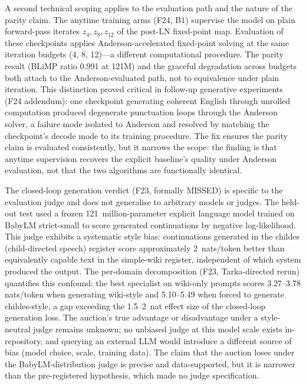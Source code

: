 A second technical scoping applies to the evaluation path and the nature of the parity claim. The anytime training arms (F24, B1) supervise the model on plain forward-pass iterates $z_4, z_8, z_{12}$ of the post-LN fixed-point map. Evaluation of these checkpoints applies Anderson-accelerated fixed-point solving at the same iteration budgets (4, 8, 12)—a different computational procedure. The parity result (BLiMP ratio 0.991 at 121M) and the graceful degradation across budgets both attach to the Anderson-evaluated path, not to equivalence under plain iteration. This distinction proved critical in follow-up generative experiments (F24 addendum): one checkpoint generating coherent English through unrolled computation produced degenerate punctuation loops through the Anderson solver, a failure mode isolated to Anderson and resolved by matching the checkpoint's decode mode to its training procedure. The fix ensures the parity claim is evaluated consistently, but it narrows the scope: the finding is that anytime supervision recovers the explicit baseline's quality under Anderson evaluation, not that the two algorithms are functionally identical.

The closed-loop generation verdict (F23, formally MISSED) is specific to the evaluation judge and does not generalise to arbitrary models or judges. The held-out test used a frozen 121~million-parameter explicit language model trained on BabyLM strict-small to score generated continuations by negative log-likelihood. This judge exhibits a systematic style bias: continuations generated in the childes (child-directed speech) register score approximately 2~nats/token better than equivalently capable text in the simple-wiki register, independent of which system produced the output. The per-domain decomposition (F23, Tarka-directed rerun) quantifies this confound: the best specialist on wiki-only prompts scores 3.27–3.78 nats/token when generating wiki-style and 5.10–5.49 when forced to generate childes-style, a gap exceeding the 1.5–2~nat effect size of the closed-loop generation loss. The auction's true advantage or disadvantage under a style-neutral judge remains unknown; no unbiased judge at this model scale exists in-repository, and querying an external LLM would introduce a different source of bias (model choice, scale, training data). The claim that the auction loses under the BabyLM-distribution judge is precise and data-supported, but it is narrower than the pre-registered hypothesis, which made no judge specification.

